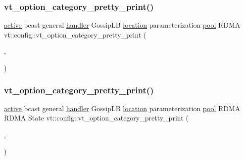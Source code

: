 \subsubsection{\texorpdfstring{vt\+\_\+option\+\_\+category\+\_\+pretty\+\_\+print()}{vt\_option\_category\_pretty\_print()}\hspace{0.1cm}{\footnotesize\ttfamily [10/16]}}
{\footnotesize\ttfamily \hyperlink{namespacevt_1_1config_a6bd1d6215bda0d8ca02811798399f689a82f77c67af0c363709010c6df4dbd920}{active} bcast general \hyperlink{namespacevt_1_1config_a6bd1d6215bda0d8ca02811798399f689a82a0081a94d5c5dfd18b0b3f7eca64b7}{handler} Gossip\+LB \hyperlink{namespacevt_1_1config_a6bd1d6215bda0d8ca02811798399f689aa8d8501591ca3859c828489054b17640}{location} parameterization \hyperlink{namespacevt_1_1config_a6bd1d6215bda0d8ca02811798399f689a50ba0efa092380eb92cee1d921d6e40f}{pool} R\+D\+MA vt\+::config\+::vt\+\_\+option\+\_\+category\+\_\+pretty\+\_\+print (\begin{DoxyParamCaption}\item[{\hyperlink{namespacevt_1_1config_a6bd1d6215bda0d8ca02811798399f689a56136ec49b937c8b480d4ac7aa7c9d8c}{rdma\+\_\+channel}}]{,  }\item[{\char`\"{}R\+D\+MA Channel\char`\"{}}]{ }\end{DoxyParamCaption})}

\mbox{\label{namespacevt_1_1config_a798c76fce82d320df1f43c83a68c707c}} 
\subsubsection{\texorpdfstring{vt\+\_\+option\+\_\+category\+\_\+pretty\+\_\+print()}{vt\_option\_category\_pretty\_print()}\hspace{0.1cm}{\footnotesize\ttfamily [11/16]}}
{\footnotesize\ttfamily \hyperlink{namespacevt_1_1config_a6bd1d6215bda0d8ca02811798399f689a82f77c67af0c363709010c6df4dbd920}{active} bcast general \hyperlink{namespacevt_1_1config_a6bd1d6215bda0d8ca02811798399f689a82a0081a94d5c5dfd18b0b3f7eca64b7}{handler} Gossip\+LB \hyperlink{namespacevt_1_1config_a6bd1d6215bda0d8ca02811798399f689aa8d8501591ca3859c828489054b17640}{location} parameterization \hyperlink{namespacevt_1_1config_a6bd1d6215bda0d8ca02811798399f689a50ba0efa092380eb92cee1d921d6e40f}{pool} R\+D\+MA R\+D\+MA State vt\+::config\+::vt\+\_\+option\+\_\+category\+\_\+pretty\+\_\+print (\begin{DoxyParamCaption}\item[{\hyperlink{namespacevt_1_1config_a6bd1d6215bda0d8ca02811798399f689afdcadb44dd13617f18aba8d42a257967}{runtime}}]{,  }\item[{\char`\"{}runtime\char`\"{}}]{ }\end{DoxyParamCaption})}

